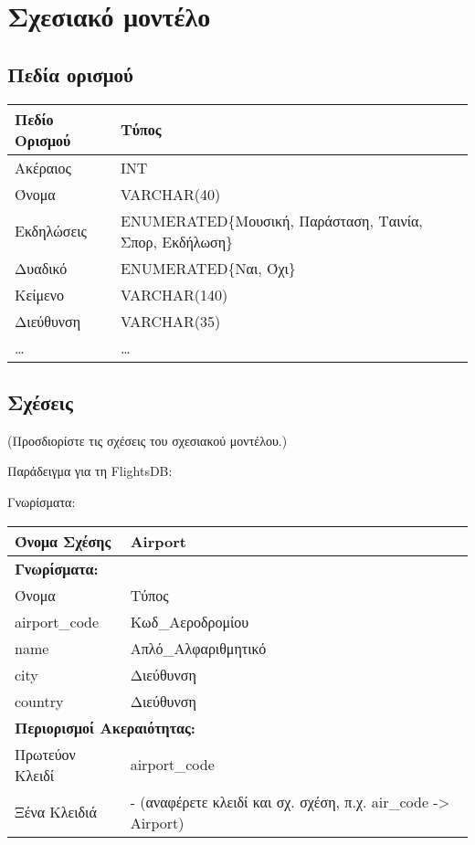 
\section{Σχεσιακό μοντέλο}

\subsection{Πεδία ορισμού}


\begin{tabular}{|p{6cm}|p{6cm}|}
\hline
  Πεδίο Ορισμού & Τύπος \\ \hline
  Ακέραιος & INT \\ \hline
  Όνομα & VARCHAR(40) \\ \hline
  Εκδηλώσεις & ENUMERATED\{Μουσική, Παράσταση, Ταινία, Σπορ,
               Εκδήλωση\} \\ \hline
  Δυαδικό & ENUMERATED\{Ναι, Όχι\} \\ \hline
  Κείμενο & VARCHAR(140) \\ \hline
  Διεύθυνση & VARCHAR(35) \\ \hline
  
… & … \\ \hline
\end{tabular}

\subsection{Σχέσεις}

(Προσδιορίστε τις σχέσεις του σχεσιακού μοντέλου.)

Παράδειγμα για τη FlightsDB:

Γνωρίσματα:

\begin{tabular}{|p{6cm}|p{6cm}|}
  \hline
  Όνομα Σχέσης & Airport \\ \hline
  \multicolumn{2}{|l|}{\textbf{Γνωρίσματα:}} \\ \hline
  Όνομα & Τύπος \\ \hline
  airport\_code & Κωδ\_Αεροδρομίου \\ \hline
  name & Απλό\_Αλφαριθμητικό \\ \hline
  city & Διεύθυνση \\ \hline
  country & Διεύθυνση \\ \hline
  \multicolumn{2}{|l|}{\textbf{Περιορισμοί Ακεραιότητας:}} \\ \hline
  Πρωτεύον Κλειδί & airport\_code \\ \hline
  Ξένα Κλειδιά & - (αναφέρετε κλειδί και σχ. σχέση, π.χ. air\_code ->
                 Airport) \\ \hline
\end{tabular}

